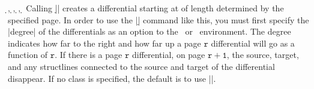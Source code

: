 \begin{sseqdata}[|| name = ex1, cohomological Serre grading]
\begin{commandlist}{
    {\d\ooptions{}},
    {\d\ooptions{}},
    {\d\ooptions{}\pars{\sourcename\opt{,\targetn}}},
    {\d\ooptions{}\pars{\sourcecoord}\pars{\targetcoord}}%
}
Calling |\d{}| creates a differential starting at  of length determined by the specified page. In order to use the |\d| command like this, you must first specify the |degree| of the differentials as an option to the \sseqdataenv\  or \sseqpageenv\  environment. The degree indicates how far to the right and how far up a page $\mathtt{r}$ differential will go as a function of $\mathtt{r}$. If there is a page $\mathtt{r}$ differential, on page $\mathtt{r+1}$, the source, target, and any structlines connected to the source and target of the differential disappear. If no class is specified, the default is to use |\lastclass|.


\end{commandlist}
\end{sseqdata}
